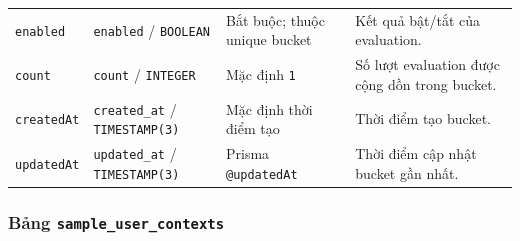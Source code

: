 \begin{table}[H]
\begin{tabular}{p{} p{} p{} p{}}
        \texttt{enabled} & \texttt{enabled} / \texttt{BOOLEAN} & Bắt buộc; thuộc unique bucket & Kết quả bật/tắt của evaluation. \\
        \texttt{count} & \texttt{count} / \texttt{INTEGER} & Mặc định \texttt{1} & Số lượt evaluation được cộng dồn trong bucket. \\
        \texttt{createdAt} & \texttt{created\_at} / \texttt{TIMESTAMP(3)} & Mặc định thời điểm tạo & Thời điểm tạo bucket. \\
        \texttt{updatedAt} & \texttt{updated\_at} / \texttt{TIMESTAMP(3)} & Prisma \texttt{@updatedAt} & Thời điểm cập nhật bucket gần nhất. \\
        \bottomrule
    \end{tabular}
    \endgroup
\end{table}

\subsubsection{Bảng \texttt{sample\_user\_contexts}}

